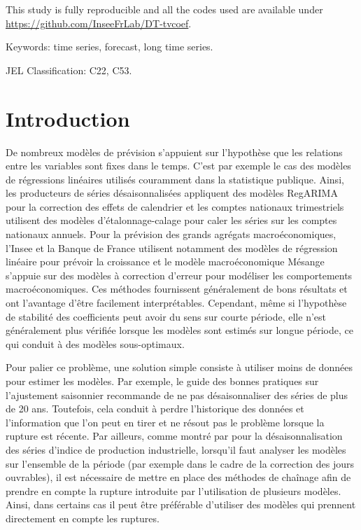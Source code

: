 \documentclass[
  a4paper,
  DIV=11,
  numbers=noendperiod,
  french]{scrartcl}
\newcommand\1{{\mathds 1}}
\renewcommand*\contentsname{Table des matières}
\newcommand\contentsname{Table des matières}
\theoremstyle{remark}
\begin{document}
This study is fully reproducible and all the codes used are available
under \url{https://github.com/InseeFrLab/DT-tvcoef}.

Keywords: time series, forecast, long time series.

JEL Classification: C22, C53.

\newpage
\renewcommand*\contentsname{Table des matières}
{
\hypersetup{linkcolor=}
\setcounter{tocdepth}{2}
\tableofcontents
}
\newpage

\section{Introduction}\label{introduction}

De nombreux modèles de prévision s'appuient sur l'hypothèse que les
relations entre les variables sont fixes dans le temps. C'est par
exemple le cas des modèles de régressions linéaires utilisés couramment
dans la statistique publique. Ainsi, les producteurs de séries
désaisonnalisées appliquent des modèles RegARIMA pour la correction des
effets de calendrier et les comptes nationaux trimestriels utilisent des
modèles d'étalonnage-calage pour caler les séries sur les comptes
nationaux annuels. Pour la prévision des grands agrégats
macroéconomiques, l'Insee \autocite[e.g.,][]{ndc2015prev} et la Banque
de France \autocite[e.g.,][]{OPTIM} utilisent notamment des modèles de
régression linéaire pour prévoir la croissance et le modèle
macroéconomique Mésange \autocite{mesange} s'appuie sur des modèles à
correction d'erreur pour modéliser les comportements macroéconomiques.
Ces méthodes fournissent généralement de bons résultats et ont
l'avantage d'être facilement interprétables. Cependant, même si
l'hypothèse de stabilité des coefficients peut avoir du sens sur courte
période, elle n'est généralement plus vérifiée lorsque les modèles sont
estimés sur longue période, ce qui conduit à des modèles sous-optimaux.

Pour palier ce problème, une solution simple consiste à utiliser moins
de données pour estimer les modèles. Par exemple, le guide des bonnes
pratiques sur l'ajustement saisonnier \autocite{eurostat2015guidelines}
recommande de ne pas désaisonnaliser des séries de plus de 20 ans.
Toutefois, cela conduit à perdre l'historique des données et
l'information que l'on peut en tirer et ne résout pas le problème
lorsque la rupture est récente. Par ailleurs, comme montré par
\textcite{JMS2018} pour la désaisonnalisation des séries d'indice de
production industrielle, lorsqu'il faut analyser les modèles sur
l'ensemble de la période (par exemple dans le cadre de la correction des
jours ouvrables), il est nécessaire de mettre en place des méthodes de
chaînage afin de prendre en compte la rupture introduite par
l'utilisation de plusieurs modèles. Ainsi, dans certains cas il peut
être préférable d'utiliser des modèles qui prennent directement en
compte les ruptures.
\end{document}

